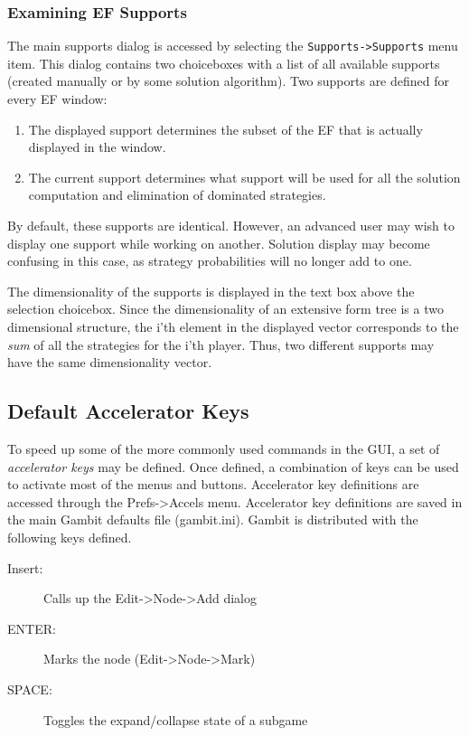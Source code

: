 {\subsubsection{Examining EF Supports}\label{efsuptexam}
The main supports dialog is accessed by selecting the {\tt Supports->Supports} 
menu item.  This dialog
contains two choiceboxes with a list of all available supports (created manually or 
by some solution algorithm).
Two supports are defined for every EF window:
\begin{enumerate}
\item The displayed support determines the subset of the EF that is actually
displayed in the window.
\item The current support determines what support will be used for all the solution
computation and elimination of dominated strategies. 
\end{enumerate}
By default, these supports are identical.  However, an advanced user may wish to
display one support while working on another.  Solution display may become 
confusing in this case, as strategy probabilities will no longer add to one.  

The dimensionality of the supports is displayed in the text box above the selection
choicebox.  Since the dimensionality of an extensive form tree is a two dimensional structure,
the i'th element in the displayed vector corresponds to the {\em sum} of all the strategies
for the i'th player.  Thus, two different supports may have the same dimensionality vector.


\subsection{Default Accelerator Keys}\label{ExtFormDefAccl}
To speed up some of the more commonly used commands in the GUI, a set of
{\em accelerator keys} may be defined.  Once defined, a combination of keys
can be used to activate most of the menus and buttons.  Accelerator key
definitions are accessed through the Prefs->Accels menu.  Accelerator key
definitions are saved in the main Gambit defaults file (gambit.ini).  Gambit
is distributed with the following keys defined.
\begin{description}
\item[Insert:] Calls up the Edit->Node->Add dialog
\item[ENTER:] Marks the node (Edit->Node->Mark)
\item[SPACE:] Toggles the expand/collapse state of a subgame
\end{description}

}
